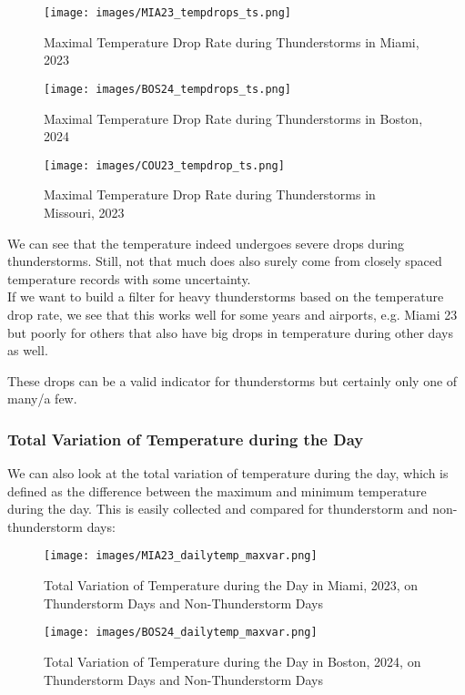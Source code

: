 \documentclass[12pt, parskip=half]{scrartcl}
\begin{document}
\begin{figure}[!h]
\centering
\texttt{[image: images/MIA23\_tempdrops\_ts.png]}
\caption{Maximal Temperature Drop Rate during Thunderstorms in Miami, 2023}
\end{figure}

\begin{figure}
\centering
\texttt{[image: images/BOS24\_tempdrops\_ts.png]}
\caption{Maximal Temperature Drop Rate during Thunderstorms in Boston, 2024}
\end{figure}

\begin{figure}
\centering
\texttt{[image: images/COU23\_tempdrop\_ts.png]}
\caption{Maximal Temperature Drop Rate during Thunderstorms in Missouri, 2023}
\end{figure}

We can see that the temperature indeed undergoes severe drops during thunderstorms.
Still, not that much does also surely come from closely spaced temperature records with some uncertainty.\\

If we want to build a filter for heavy thunderstorms based on the temperature drop rate, we see that this works well for some years and airports, e.g. Miami 23 but poorly for others that also have big drops in temperature during other days as well.

These drops can be a valid indicator for thunderstorms but certainly only one of many/a few.

\subsubsection{Total Variation of Temperature during the Day}
We can also look at the total variation of temperature during the day, which is defined as the difference between the maximum and minimum temperature during the day.
This is easily collected and compared for thunderstorm and non-thunderstorm days:

\begin{figure}[!h]
\centering
\texttt{[image: images/MIA23\_dailytemp\_maxvar.png]}
\caption{Total Variation of Temperature during the Day in Miami, 2023, on Thunderstorm Days and Non-Thunderstorm Days}
\end{figure}

\begin{figure}[!h]
\centering
\texttt{[image: images/BOS24\_dailytemp\_maxvar.png]}
\caption{Total Variation of Temperature during the Day in Boston, 2024, on Thunderstorm Days and Non-Thunderstorm Days}
\end{figure}
\end{document}
